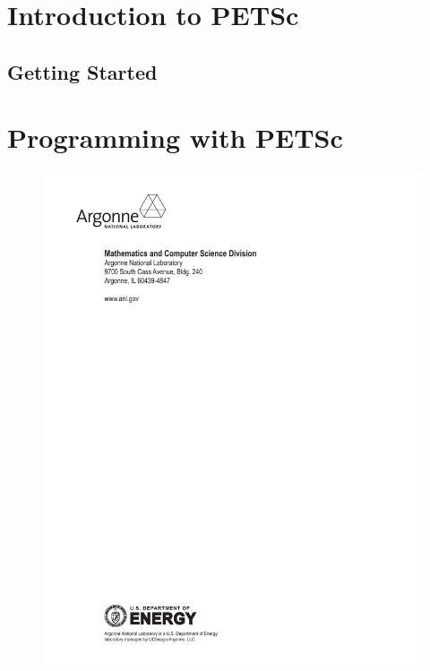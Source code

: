 \documentclass[twoside,11pt]{../sty/report_petsc}
\begin{document}
\cleardoublepage
\part{Introduction to PETSc}
\label{part_intro}
\cleardoublepage
\chapter{Getting Started}


\cleardoublepage
\part{Programming with PETSc}
\label{part_usage}





\cleardoublepage

\addtocounter{chapter}{1}
\label{sec:bib}


\pagestyle{empty}
\begin{figure}[hbt]
\centerline{\includegraphics{endpage}}
\end{figure}
\end{document}
